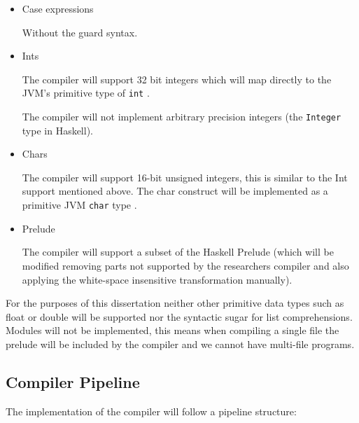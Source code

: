 \documentclass[a4paper]{article}
\begin{document}
\begin{itemize}
    \item Case expressions 
      
      Without the guard syntax.

    \item Ints

      The compiler will support 32 bit integers which will map directly to the JVM's primitive type of \texttt{int} \cite{jvm-spec8}.

      The compiler will not implement arbitrary precision integers (the \texttt{Integer} type in Haskell).

    \item Chars

      The compiler will support 16-bit unsigned integers, this is similar to the Int support mentioned above. The char construct will be implemented as a 
      primitive JVM \texttt{char} type \cite{jvm-spec8}.

    \item Prelude

      The compiler will support a subset of the Haskell Prelude (which will be modified removing parts not supported by the researchers compiler 
      and also applying the white-space insensitive transformation manually).

  \end{itemize}
  For the purposes of this dissertation neither other primitive data types such as float or double will be supported nor the syntactic sugar for list comprehensions.
  Modules will not be implemented, this means when compiling a single file the prelude will be included by the compiler and we cannot have multi-file programs.

  \subsection*{Compiler Pipeline}
  The implementation of the compiler will follow a pipeline structure:
\end{document}
